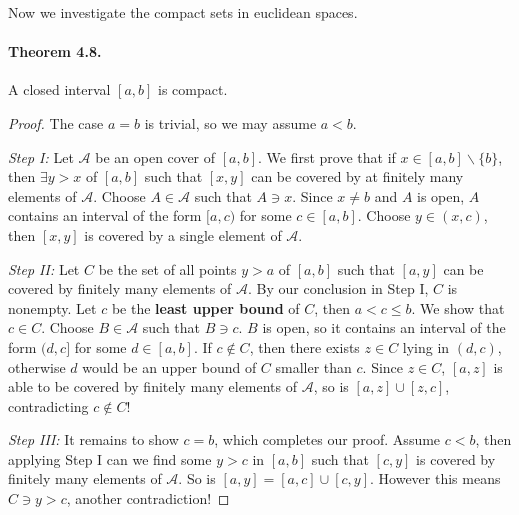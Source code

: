 \documentclass{article}
\numberwithin{equation}{section}
\theoremstyle{plain}
\theoremstyle{definition}
\begin{document}
Now we investigate the compact sets in euclidean spaces.

\paragraph{Theorem 4.8.\label{thm:4.8}} A closed interval $[a,b]$ is compact.

\begin{proof}
The case $a=b$ is trivial, so we may assume $a<b$. 

\textit{Step I:} Let $\mathscr{A}$ be an open cover of $[a,b]$. We first prove that if $x\in[a,b]\backslash\{b\}$, then $\exists y>x$ of $[a,b]$ such that $[x,y]$ can be covered by at finitely many elements of $\mathscr{A}$. Choose $A\in\mathscr{A}$ such that $A\ni x$. Since $x\neq b$ and $A$ is open, $A$ contains an interval of the form $[a,c)$ for some $c\in[a,b]$. Choose $y\in(x,c)$, then $[x,y]$ is covered by a single element of $\mathscr{A}$.

\textit{Step II:} Let $C$ be the set of all points $y>a$ of $[a,b]$ such that $[a,y]$ can be covered by finitely many elements of $\mathscr{A}$. By our conclusion in Step I, $C$ is nonempty. Let $c$ be the \textbf{least upper bound} of $C$, then $a<c\leq b$. We show that $c\in C$. Choose $B\in\mathscr{A}$ such that $B\ni c$. $B$ is open, so it contains an interval of the form $(d,c]$ for some $d\in[a,b]$. If $c\notin C$, then there exists $z\in C$ lying in $(d,c)$, otherwise $d$ would be an upper bound of $C$ smaller than $c$. Since $z\in C$, $[a,z]$ is able to be covered by finitely many elements of $\mathscr{A}$, so is $[a,z]\cup[z,c]$, contradicting $c\notin C$!

\textit{Step III:} It remains to show $c=b$, which completes our proof. Assume $c<b$, then applying Step I can we find some $y>c$ in $[a,b]$ such that $[c,y]$ is covered by finitely many elements of $\mathscr{A}$. So is $[a,y]=[a,c]\cup[c,y]$. However this means $C\ni y > c$, another contradiction!
\end{proof}
\end{document}
